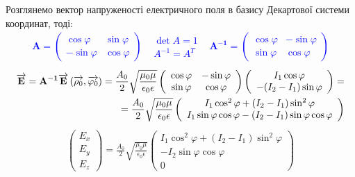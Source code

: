 Розглянемо вектор напруженості електричного поля в базису Декартової 
системи координат, тоді: 
%
\textcolor{blue} { \begin{equation*} \begin{aligned}
\mathbf{A} = \left( \begin{array}{cc}
\cos \varphi & \sin \varphi \\
- \sin \varphi & \cos \varphi
\end{array} \right) \begin{array}{ccc}
	& \det A = 1 		&	\\
	& A^{-1} = A^{T}	&
\end{array} 
\mathbf{A^{-1}} = \left( \begin{array}{cc}
\cos \varphi & - \sin \varphi \\
\sin \varphi & \cos \varphi
\end{array} \right) 
\end{aligned} \end{equation*} }
%
\textcolor{blue} { \begin{equation*} \begin{aligned}
\overrightarrow{\mathbf E} = 
\mathbf{A^{-1}} \overrightarrow{\mathbf E} \left( \overrightarrow{\mathbf \rho_0}, \overrightarrow{\mathbf \varphi_0} \right) = 
\frac{A_0}{2} \sqrt{\frac{\mu_0 \mu}{\epsilon_0 \epsilon}}
\left( \begin{array}{cc} \cos \varphi & - \sin \varphi \\
\sin \varphi & \cos \varphi \end{array} \right)
\left( \begin{array}{c} I_1 \cos \varphi \\
- (I_2 - I_1) \sin \varphi \end{array} \right) = \\
= \frac{A_0}{2} \sqrt{\frac{\mu_0 \mu}{\epsilon_0 \epsilon}}
\left( \begin{array}{c} I_1 \cos^2 \varphi + (I_2 - I_1) \sin^2 \varphi \\
I_1 \sin \varphi \cos \varphi - (I_2 - I_1) 
\sin \varphi \cos \varphi \end{array} \right)
\end{aligned} \end{equation*} }
%
\begin{equation} \begin{aligned} \label{eq:Exyz}
\left( \begin{array}{c} E_x \\ E_y \\ E_z \end{array} \right) = 
\frac{A_0}{2}  \sqrt{\frac{\mu_0 \mu}{\epsilon_0 \epsilon}} 
\left( \begin{array}{c} 
I_1 \cos^2 \varphi + (I_2 - I_1) \sin^2 \varphi \\
- I_2 \sin \varphi \cos \varphi \\
0
\end{array} \right)
\end{aligned} \end{equation}

